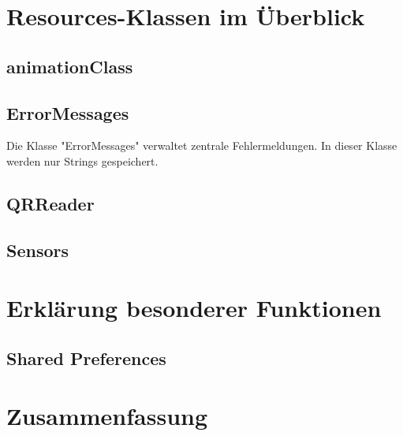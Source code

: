 \documentclass[11pt]{article} %
\begin{document}
\section{Resources-Klassen im Überblick}

\subsection{animationClass}

\subsection{ErrorMessages}
Die Klasse "ErrorMessages" verwaltet zentrale Fehlermeldungen. In dieser Klasse werden nur Strings gespeichert.

\subsection{QRReader}

\subsection{Sensors}

\section{Erklärung besonderer Funktionen}

\subsection{Shared Preferences}

\section{Zusammenfassung}
\end{document}
